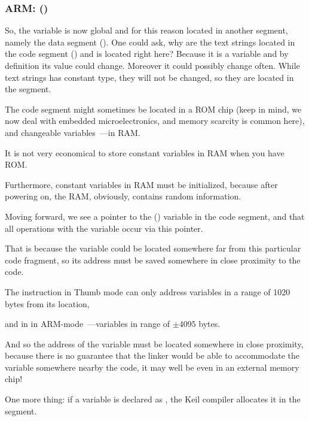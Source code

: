 \subsubsection{ARM: \OptimizingKeilVI (\ThumbMode)}



So, the  variable is now global and for this reason located in another segment, namely the data segment ().
One could ask, why are the text strings located in the code segment () and  is located right here?
Because it is a variable and by definition its value could change. Moreover it could possibly change often.
While text strings has constant type, they will not be changed, so they are located in the  segment.
\myindex{\RAM}
\myindex{\ROM}

The code segment might sometimes be located in a \ac{ROM} chip (keep in mind, we now deal
with embedded microelectronics, and memory scarcity is common here), and changeable 
variables~---in \ac{RAM}.

It is not very economical to store constant variables in RAM when you have ROM.

Furthermore, constant variables in RAM must be initialized, because after powering on, the RAM, obviously, contains random information.


Moving forward, we see a pointer to the  () variable in the code segment, and that all
operations with the variable occur via this pointer.

That is because the  variable could be located somewhere far from this particular code fragment, so its address
must be saved somewhere in close proximity to the code.

The  instruction in Thumb mode can only address variables in a range of 1020 bytes from its location, 

and in in ARM-mode~---variables in range of $\pm{}4095$ bytes.

And so the address of the  variable
must be located somewhere in close proximity, because there is no guarantee that the linker would be able to accommodate the variable somewhere nearby the code, it may well be even in an external memory chip!

\myindex{\ROM}

One more thing: if a variable is declared as , the Keil compiler allocates it in 
the  segment.

